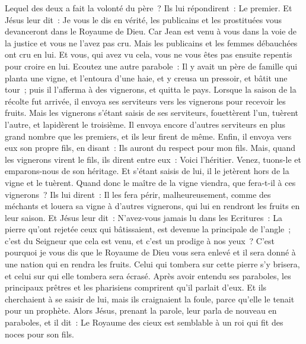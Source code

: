\begin{multicols}{2}
Lequel des deux a fait la volonté du père~? Ils lui répondirent~: Le premier. Et Jésus leur dit~: Je vous le dis en vérité, les publicains et les prostituées vous devanceront dans le Royaume de Dieu.
Car Jean est venu à vous dans la voie de la justice et vous ne l'avez pas cru. Mais les publicains et les femmes débauchées ont cru en lui. Et vous, qui avez vu cela, vous ne vous êtes pas ensuite repentis pour croire en lui.
Ecoutez une autre parabole~: Il y avait un père de famille qui planta une vigne, et l'entoura d'une haie, et y creusa un pressoir, et bâtit une tour~; puis il l'afferma à des vignerons, et quitta le pays.
Lorsque la saison de la récolte fut arrivée, il envoya ses serviteurs vers les vignerons pour recevoir les fruits.
Mais les vignerons s'étant saisis de ses serviteurs, fouettèrent l'un, tuèrent l'autre, et lapidèrent le troisième.
Il envoya encore d'autres serviteurs en plus grand nombre que les premiers, et ils leur firent de même.
Enfin, il envoya vers eux son propre fils, en disant~: Ils auront du respect pour mon fils.
Mais, quand les vignerons virent le fils, ils dirent entre eux~: Voici l'héritier. Venez, tuons-le et emparons-nous de son héritage.
Et s'étant saisis de lui, il le jetèrent hors de la vigne et le tuèrent.
Quand donc le maître de la vigne viendra, que fera-t-il à ces vignerons~?
Ils lui dirent~: Il les fera périr, malheureusement, comme des méchants et louera sa vigne à d'autres vignerons, qui lui en rendront les fruits en leur saison.
Et Jésus leur dit~: N'avez-vous jamais lu dans les Ecritures~: La pierre qu'ont rejetée ceux qui bâtissaient, est devenue la principale de l'angle~; c'est du Seigneur que cela est venu, et c'est un prodige à nos yeux~?
C'est pourquoi je vous dis que le Royaume de Dieu vous sera enlevé et il sera donné à une nation qui en rendra les fruits.
Celui qui tombera sur cette pierre s'y brisera, et celui sur qui elle tombera sera écrasé.
Après avoir entendu ses paraboles, les principaux prêtres et les pharisiens comprirent qu'il parlait d'eux.
Et ils cherchaient à se saisir de lui, mais ils craignaient la foule, parce qu'elle le tenait pour un prophète.
\VerseOne{}Alors Jésus, prenant la parole, leur parla de nouveau en paraboles, et il dit~:
Le Royaume des cieux est semblable à un roi qui fit des noces pour son fils.

\end{multicols}
